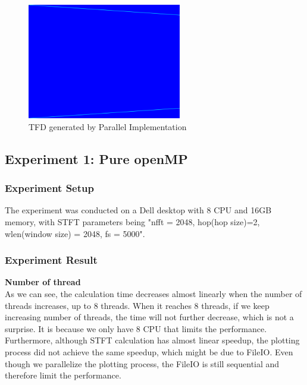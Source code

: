 \documentclass[11pt,letter]{article}
\begin{document}
\begin{figure}[H]
\centering
\includegraphics[width = 0.6\textwidth]{fig/tfd_par.png}
\caption{TFD generated by Parallel Implementation}
\label{fig:tfd_par}
\end{figure}

\subsection{Experiment 1: Pure openMP}

\subsubsection{Experiment Setup}
The experiment was conducted on a Dell desktop with 8 CPU and 16GB memory, with STFT parameters being "nfft = 2048, hop(hop size)=2, wlen(window size) = 2048, fs = 5000".

\subsubsection{Experiment Result}
\textbf{Number of thread}\\
As we can see, the calculation time decreases almost linearly when the number of threads increases, up to 8 threads. When it reaches 8 threads, if we keep increasing number of threads, the time will not further decrease, which is not a surprise. It is because we only have 8 CPU that limits the performance. Furthermore, although STFT calculation has almost linear speedup, the plotting process did not achieve the same speedup, which might be due to FileIO. Even though we parallelize the plotting process, the FileIO is still sequential and therefore limit the performance.
\end{document}
